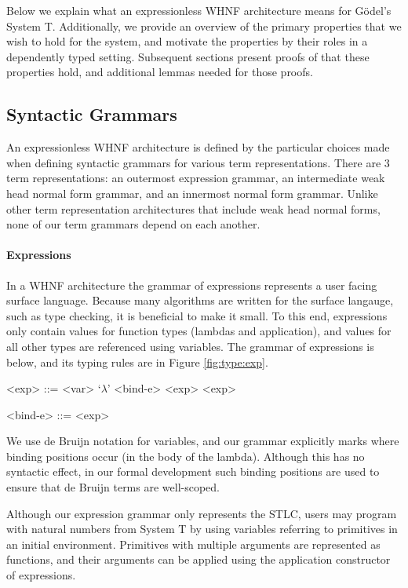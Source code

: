 \documentclass[preprint,authoryear]{sigplanconf}
\newcommand{\reffig}[1]{Figure \ref{fig:#1}}
\begin{document}
Below we explain what an expressionless WHNF
architecture means for G{\"o}del's System T.
Additionally, we provide an overview of the primary properties that we
wish to hold for the system, and motivate the properties by their roles in a
dependently typed setting. Subsequent sections present proofs of
that these properties hold, and additional lemmas needed for those
proofs.

\subsection{Syntactic Grammars}

An expressionless WHNF architecture is defined by the particular
choices made when defining syntactic grammars for various term
representations. There are 3 term representations: an outermost
expression grammar, an intermediate weak head normal form grammar, and
an innermost normal form grammar. Unlike other term
representation architectures that include weak head normal forms, none
of our term grammars depend on each another.

\paragraph{Expressions}

In a WHNF architecture the grammar of expressions represents a user
facing surface language. Because many algorithms are written for the
surface langauge, such as type checking, it is beneficial to make it
small. To this end, expressions only contain values for function types
(lambdas and application), and values for all other types are
referenced using variables. The grammar of expressions is below, and
its typing rules are in \reffig{type:exp}.

\begin{grammar}
<exp> ::= <var> 
\alt `\(\lambda\)' <bind-e>
\alt <exp> <exp>

<bind-e> ::= <exp> 
\end{grammar}

We use de Bruijn notation for variables, and our grammar
explicitly marks where binding positions occur (in the body of the
lambda). Although this has no syntactic effect, in our formal
development such binding positions are used to ensure that de Bruijn
terms are well-scoped.

Although our expression grammar only represents the STLC, users may
program with natural numbers from System T by using variables
referring to primitives in an initial environment. Primitives with
multiple arguments are represented as functions, and their arguments
can be applied using the application constructor of expressions.
\end{document}
